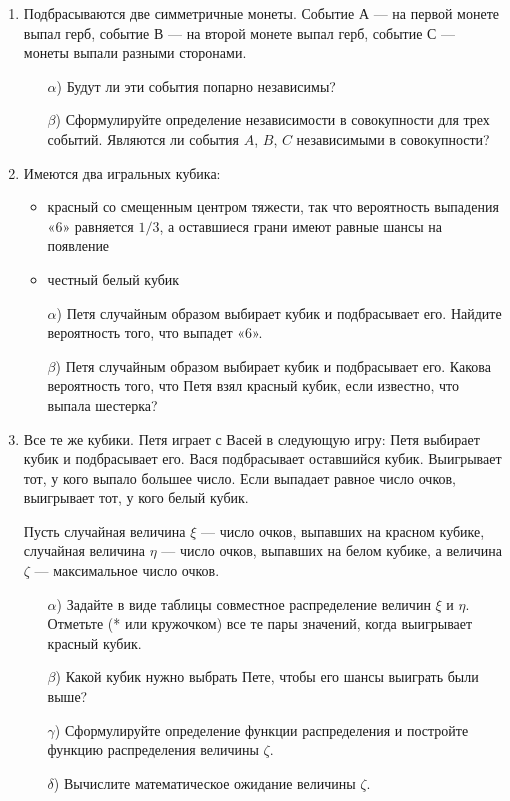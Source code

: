\begin{enumerate}
\item
Подбрасываются две симметричные монеты. Событие $А$ — на первой монете выпал
герб, событие $В$ — на второй монете выпал герб, событие $С$ — монеты выпали
разными сторонами.
\begin{enumerate}
    \item[$\alpha$)] Будут ли эти события попарно независимы?
    \item[$\beta$)]  Сформулируйте определение независимости в совокупности для трех событий. Являются ли события $A$, $B$, $C$ независимыми в совокупности?
\end{enumerate}

\item
Имеются два игральных кубика:
\begin{itemize}
    \item красный со смещенным центром тяжести, так что вероятность выпадения «6»
    равняется $1/3$, а оставшиеся грани имеют равные шансы на появление
    \item честный белый кубик
\end{itemize}

\begin{enumerate}
    \item[$\alpha$)] Петя случайным образом выбирает кубик и подбрасывает его.
    Найдите вероятность того, что выпадет «6».
    \item[$\beta$)]   Петя случайным образом выбирает кубик и подбрасывает его.
    Какова вероятность того, что Петя взял красный кубик, если известно, что выпала
    шестерка?
\end{enumerate}

\item
Все те же кубики. Петя играет с Васей в следующую игру: Петя выбирает кубик и
подбрасывает его. Вася подбрасывает оставшийся кубик. Выигрывает тот, у кого
выпало большее число. Если выпадает равное число очков, выигрывает тот, у кого
белый кубик.

Пусть случайная величина $\xi$ — число очков, выпавших на красном кубике,
случайная величина $\eta$ — число очков,
выпавших на белом кубике, а величина $\zeta$ — максимальное число очков.

\begin{enumerate}
    \item[$\alpha$)] Задайте в виде таблицы совместное распределение величин $\xi$ и $\eta$.
    Отметьте (* или кружочком) все те пары значений, когда выигрывает красный кубик.
    \item[$\beta$)] Какой кубик нужно выбрать Пете, чтобы его шансы выиграть были выше?
    \item[$\gamma$)] Сформулируйте определение функции распределения и постройте функцию
    распределения величины $\zeta$.
    \item[$\delta$)] Вычислите математическое ожидание величины $\zeta$.
\end{enumerate}


\end{enumerate}
